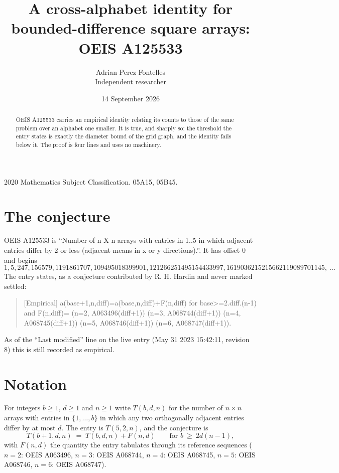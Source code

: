 \documentclass[11pt,a4paper]{article}
\title{A cross-alphabet identity for bounded-difference square arrays: OEIS A125533}
\author{Adrian Perez Fontelles\\ \small Independent researcher}
\date{14 September 2026}
\theoremstyle{plain}
\theoremstyle{definition}
\begin{document}
\maketitle

\begin{abstract}
OEIS A125533 carries an empirical identity relating its counts to those of the same problem over an
alphabet one smaller. It is true, and sharply so: the threshold the entry states is exactly the
diameter bound of the grid graph, and the identity fails below it. The proof is four lines and
uses no machinery.
\end{abstract}

\noindent\small 2020 Mathematics Subject Classification. 05A15, 05B45.\normalsize

\section{The conjecture}

OEIS A125533 is ``Number of n X n arrays with entries in 1..5 in which adjacent entries differ by 2 or less (adjacent means in x or y directions).''. It has offset $0$ and begins
\[
1, 5, 247, 156579, 1191861707, 109495018399901, 121266251495154433997, 1619036215215662119089701145,\ \dots
\]
The entry states, as a conjecture contributed by R. H. Hardin and never marked settled:
\begin{quote}
[Empirical] a(base+1,n,diff)=a(base,n,diff)+F(n,diff) for base>=2.diff.(n-1) and F(n,diff)= (n=2, A063496(diff+1)) (n=3, A068744(diff+1)) (n=4, A068745(diff+1)) (n=5, A068746(diff+1)) (n=6, A068747(diff+1)).
\end{quote}
As of the ``Last modified'' line on the live entry (May 31 2023 15:42:11, revision 8)
this is still recorded as empirical.

\section{Notation}

For integers $b\ge1$, $d\ge1$ and $n\ge1$ write $T(b,d,n)$ for the number of $n\times n$ arrays
with entries in $\{1,\dots,b\}$ in which any two orthogonally adjacent entries differ by at
most $d$. The entry is $T(5,2,n)$, and the conjecture is
\[
T(b+1,d,n)\;=\;T(b,d,n)+F(n,d)\qquad\text{for } b\ \ge\ 2d(n-1),
\]
with $F(n,d)$ the quantity the entry tabulates through its reference sequences ($n=2$: OEIS A063496, $n=3$: OEIS A068744, $n=4$: OEIS A068745, $n=5$: OEIS A068746, $n=6$: OEIS A068747).
\end{document}
